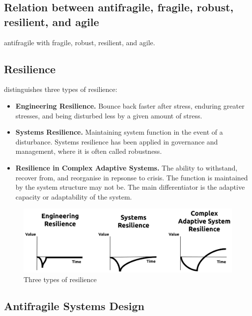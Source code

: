 \subsection{Relation between antifragile, fragile, robust, resilient, and agile}
\label{sub:tbrelatedtoantifragile}

\gls{antifragile} with \gls{fragile}, \gls{robust}, \gls{resilient}, and \gls{agile}.

\subsection{Resilience}
\label{sub:tbresilience}
\textcite[p. 5-7]{MartinBreen2011} distinguishes three types of resilience:
\begin{itemize}
	\item{\textbf{Engineering Resilience.} Bounce back faster after stress, enduring greater stresses, and being disturbed less by a given amount of stress.}
	\item{\textbf{Systems Resilience.} Maintaining system function in the event of a disturbance. Systems resilience has been applied in governance and management, where it is often called robustness.}
	\item{\textbf{Resilience in Complex Adaptive Systems.} The ability to withstand, recover from, and reorganise in repsonse to crisis. The function is maintained by the system structure may not be. The main differentiator is the adaptive capacity or adaptability of the system.}
\end{itemize}

\begin{figure}[h!]
	\centering
	\includegraphics[width=0.7\linewidth]{images/eaal-martin-breen}
	\caption[Three types of resilience]{Three types of resilience \parencite{Botjes2020}}
	\label{fig:eaal-martin-breen}
\end{figure}




\subsection{Antifragile Systems Design}
\label{sub:backgroundasd}



